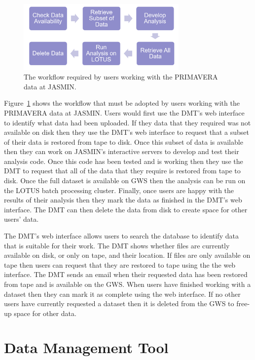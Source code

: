 \documentclass[gmd, manuscript]{copernicus}
\begin{document}
\begin{figure}[t]
	\includegraphics[width=8.3cm]{fig02.png}
	\caption{The workflow required by users working with the PRIMAVERA data at JASMIN.}
	\label{analysis_workflow}
\end{figure}

Figure~\ref{analysis_workflow} shows the workflow that must be adopted by users working with the PRIMAVERA data at JASMIN. Users would first use the DMT's web interface to identify what data had been uploaded. If they data that they required was not available on disk then they use the DMT's web interface to request that a subset of their data is restored from tape to disk. Once this subset of data is available then they can work on JASMIN's interactive servers to develop and test their analysis code. Once this code has been tested and is working then they use the DMT to request that all of the data that they require is restored from tape to disk. Once the full dataset is available on GWS then the analysis can be run on the LOTUS batch processing cluster. Finally, once users are happy with the results of their analysis then they mark the data as finished in the DMT's web interface. The DMT can then delete the data from disk to create space for other users' data.

The DMT's web interface allows users to search the database to identify data that is suitable for their work. The DMT shows whether files are currently available on disk, or only on tape, and their location. If files are only available on tape then users can request that they are restored to tape using the the web interface. The DMT sends an email when their requested data has been restored from tape and is available on the GWS. When users have finished working with a dataset then they can mark it as complete using the web interface. If no other users have currently requested a dataset then it is deleted from the GWS to free-up space for other data.

\section{Data Management Tool}
\end{document}
